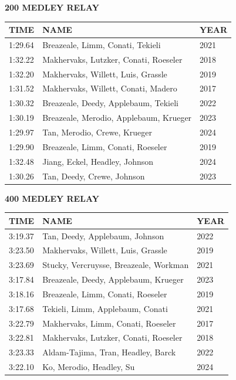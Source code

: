 \begin{table}[H]
\centering
\begin{minipage}[t]{0.6\textwidth}
\centering
\textbf{200 MEDLEY RELAY}\\[0.1cm]
\begin{tabular}{@{}p{1.8cm}p{2.8cm}p{1.2cm}@{}}
\hline
    \textbf{TIME} & \textbf{NAME} & \textbf{YEAR} \\
\hline
    1:29.64 & Breazeale, Limm, Conati, Tekieli & 2021 \\
    1:32.22 & Makhervaks, Lutzker, Conati, Roeseler & 2018 \\
    1:32.20 & Makhervaks, Willett, Luis, Grassle & 2019 \\
    1:31.52 & Makhervaks, Willett, Conati, Madero & 2017 \\
    1:30.32 & Breazeale, Deedy, Applebaum, Tekieli & 2022 \\
    1:30.19 & Breazeale, Merodio, Applebaum, Krueger & 2023 \\
    1:29.97 & Tan, Merodio, Crewe, Krueger & 2024 \\
    1:29.90 & Breazeale, Limm, Conati, Roeseler & 2019 \\
    1:32.48 & Jiang, Eckel, Headley, Johnson & 2024 \\
    1:30.26 & Tan, Deedy, Crewe, Johnson & 2023 \\
\hline
\end{tabular}
\end{minipage}
\end{table}

\begin{table}[H]
\centering
\begin{minipage}[t]{0.6\textwidth}
\centering
\textbf{400 MEDLEY RELAY}\\[0.1cm]
\begin{tabular}{@{}p{1.8cm}p{2.8cm}p{1.2cm}@{}}
\hline
    \textbf{TIME} & \textbf{NAME} & \textbf{YEAR} \\
\hline
    3:19.37 & Tan, Deedy, Applebaum, Johnson & 2022 \\
    3:23.50 & Makhervaks, Willett, Luis, Grassle & 2019 \\
    3:23.69 & Stucky, Vercruysse, Breazeale, Workman & 2021 \\
    3:17.84 & Breazeale, Deedy, Applebaum, Krueger & 2023 \\
    3:18.16 & Breazeale, Limm, Conati, Roeseler & 2019 \\
    3:17.68 & Tekieli, Limm, Applebaum, Conati & 2021 \\
    3:22.79 & Makhervaks, Limm, Conati, Roeseler & 2017 \\
    3:22.81 & Makhervaks, Lutzker, Conati, Roeseler & 2018 \\
    3:23.33 & Aldam-Tajima, Tran, Headley, Barck & 2022 \\
    3:22.10 & Ko, Merodio, Headley, Su & 2024 \\
\hline
\end{tabular}
\end{minipage}
\end{table}

